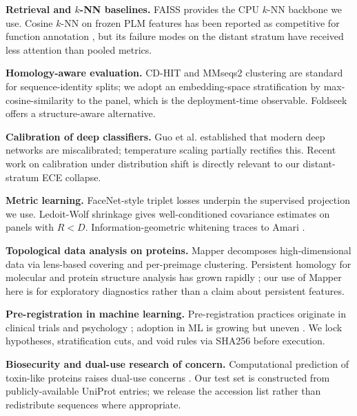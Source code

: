 \documentclass[11pt]{article}
\begin{document}
\textbf{Retrieval and $k$-NN baselines.} FAISS \cite{johnson2019billion} provides the CPU $k$-NN backbone we use. Cosine $k$-NN on frozen PLM features has been reported as competitive for function annotation \cite{littmann2021embeddings,kilinc2023protein}, but its failure modes on the distant stratum have received less attention than pooled metrics.

\textbf{Homology-aware evaluation.} CD-HIT \cite{fu2012cdhit} and MMseqs2 \cite{steinegger2017mmseqs2} clustering are standard for sequence-identity splits; we adopt an embedding-space stratification by max-cosine-similarity to the panel, which is the deployment-time observable. Foldseek \cite{vankempen2024foldseek} offers a structure-aware alternative.

\textbf{Calibration of deep classifiers.} Guo et al. \cite{guo2017calibration} established that modern deep networks are miscalibrated; temperature scaling partially rectifies this. Recent work on calibration under distribution shift \cite{ovadia2019shift} is directly relevant to our distant-stratum ECE collapse.

\textbf{Metric learning.} FaceNet-style triplet losses \cite{schroff2015facenet} underpin the supervised projection we use. Ledoit-Wolf shrinkage \cite{ledoit2004} gives well-conditioned covariance estimates on panels with $R < D$. Information-geometric whitening traces to Amari \cite{amari2016}.

\textbf{Topological data analysis on proteins.} Mapper \cite{singh2007topological} decomposes high-dimensional data via lens-based covering and per-preimage clustering. Persistent homology for molecular and protein structure analysis has grown rapidly \cite{carlsson2009topology,edelsbrunner2010computational}; our use of Mapper here is for exploratory diagnostics rather than a claim about persistent features.

\textbf{Pre-registration in machine learning.} Pre-registration practices originate in clinical trials and psychology \cite{nosek2018preregistration}; adoption in ML is growing but uneven \cite{forde2019scientific}. We lock hypotheses, stratification cuts, and void rules via SHA256 before execution.

\textbf{Biosecurity and dual-use research of concern.} Computational prediction of toxin-like proteins raises dual-use concerns \cite{urbina2022dualuse}. Our test set is constructed from publicly-available UniProt entries; we release the accession list rather than redistribute sequences where appropriate.
\end{document}

